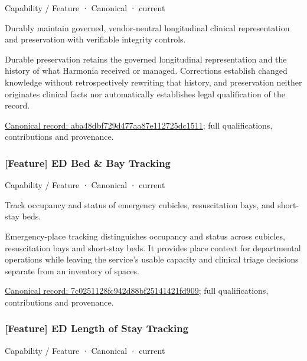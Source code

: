 \label{element:aba48dbf729d477aa87e112725dc1511}
{\small Capability / Feature · Canonical · current}\par

Durably maintain governed, vendor-neutral longitudinal clinical representation and preservation with verifiable integrity controls.



Durable preservation retains the governed longitudinal representation and the history of what Harmonia received or managed. Corrections establish changed knowledge without retrospectively rewriting that history, and preservation neither originates clinical facts nor automatically establishes legal qualification of the record.


{\footnotesize \href{../../../../continuum/strategy/capability/feature/aba48dbf729d477aa87e112725dc1511.md}{Canonical record: aba48dbf729d477aa87e112725dc1511}; full qualifications, contributions and provenance.}\par
\subsubsection{[Feature] ED Bed \& Bay Tracking}

\label{element:7c0251128fc942d88bf25141421fd909}
{\small Capability / Feature · Canonical · current}\par

Track occupancy and status of emergency cubicles, resuscitation bays, and short-stay beds.



Emergency-place tracking distinguishes occupancy and status across cubicles, resuscitation bays and short-stay beds. It provides place context for departmental operations while leaving the service's usable capacity and clinical triage decisions separate from an inventory of spaces.


{\footnotesize \href{../../../../continuum/strategy/capability/feature/7c0251128fc942d88bf25141421fd909.md}{Canonical record: 7c0251128fc942d88bf25141421fd909}; full qualifications, contributions and provenance.}\par
\subsubsection{[Feature] ED Length of Stay Tracking}

\label{element:e544f3d76db84dfaad57880d13a873c4}
{\small Capability / Feature · Canonical · current}\par

